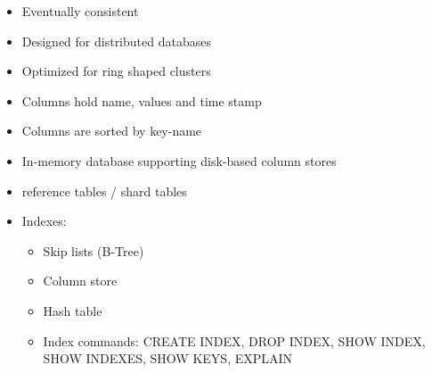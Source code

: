 \begin{breakbox}
\begin{itemize}
	\item Eventually consistent
	\item Designed for distributed databases
	\item Optimized for ring shaped clusters
	\item Columns hold name, values and time stamp
	\item Columns are sorted by key-name
\end{itemize}
\end{breakbox}

\begin{breakbox}
\begin{itemize}
	\item In-memory database supporting disk-based column stores
	\item reference tables / shard tables
	\item Indexes:
		\begin{itemize}
			\item Skip lists (B-Tree)
			\item Column store
			\item Hash table
			\item Index commands: CREATE INDEX, DROP INDEX, SHOW INDEX, SHOW INDEXES, SHOW KEYS, EXPLAIN
		\end{itemize}
\end{itemize}
\end{breakbox}


























